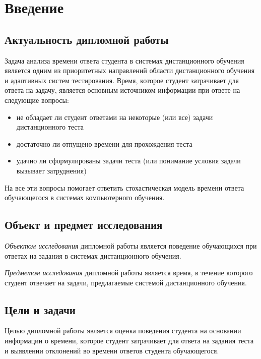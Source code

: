 \chapter{Введение}

\label{intr}
\section{Актуальность дипломной работы}
Задача анализа времени ответа студента в системах дистанционного обучения является одним из приоритетных направлений области дистанционного обучения и адаптивных систем тестирования. 
Время, которое студент затрачивает для ответа на задачу, является основным источником информации при ответе на следующие вопросы:
\begin{itemize}
\item не обладает ли студент ответами на некоторые (или все) задачи дистанционного теста
\item достаточно ли отпущено времени для прохождения теста
\item удачно ли сформулированы задачи теста (или понимание условия задачи вызывает затруднения)
\end{itemize}

На все эти вопросы помогает ответить стохастическая модель времени ответа \\обучающегося в системах компьютерного обучения.

\section{Объект и предмет исследования}
{\itshape Объектом исследования} дипломной работы является поведение обучающихся при\\ ответах на задания в системах дистанционного обучения. 

{\itshape Предметом исследования} дипломной работы является время, в течение которого \\студент отвечает на задачи, предлагаемые системой дистанционного обучения. 

\section{Цели и задачи}

Целью дипломной работы является оценка поведения студента на основании информа\-ции о времени, которое студент затрачивает для ответа на задания теста и выявлении отклонений во времени ответов студента обучающегося.

